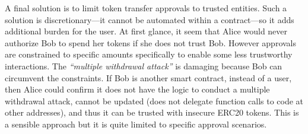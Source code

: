 A final solution is to limit token transfer approvals to trusted entities. Such a solution is discretionary---it cannot be automated within a contract---so it adds additional burden for the user. At first glance, it seem that Alice would never authorize Bob to spend her tokens if she does not trust Bob. However approvals are constrained to specific amounts specifically to enable some less trustworthy interactions. The \textit{``multiple withdrawal attack''} is damaging because Bob can circumvent the constraints. If Bob is another smart contract, instead of a user, then Alice could confirm it does not have the logic to conduct a multiple withdrawal attack, cannot be updated (\eg does not delegate function calls to code at other addresses), and thus it can be trusted with insecure ERC20 tokens. This is a sensible approach but it is quite limited to specific approval scenarios.
